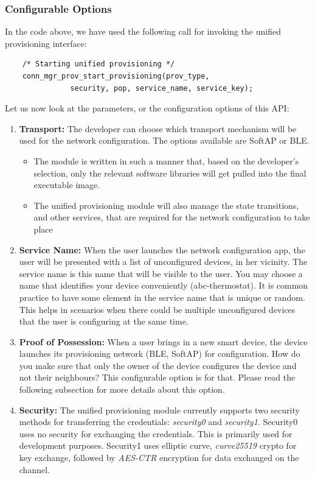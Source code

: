 \documentclass[main.tex]{subfiles}
\begin{document}
\subsubsection{Configurable Options}
In the code above, we have used the following call for invoking the unified provisioning interface:
\begin{verbatim}
    /* Starting unified provisioning */
    conn_mgr_prov_start_provisioning(prov_type,
               security, pop, service_name, service_key);
\end{verbatim}

Let us now look at the parameters, or the configuration options of this API:
\begin{enumerate}
    \item \textbf{Transport:} The developer can choose which transport mechanism will be used for the network configuration. The options available are SoftAP or BLE. 
    \begin{itemize}
        \item The module is written in such a manner that, based on the developer's selection, only the relevant software libraries will get pulled into the final executable image. 
        \item The unified provisioning module will also manage the state transitions, and other services, that are required for the network configuration to take place
    \end{itemize}
    \item \textbf{Service Name:} When the user launches the network configuration app, the user will be presented with a list of unconfigured devices, in her vicinity. The service name is this name that will be visible to the user. You may choose a name that identifies your device conveniently (abc-thermostat). It is common practice to have some element in the service name that is unique or random. This helps in scenarios when there could be multiple unconfigured devices that the user is configuring at the same time.
    \item \textbf{Proof of Possession:} When a user brings in a new smart device, the device launches its provisioning network (BLE, SoftAP) for configuration.  How do you make sure that only the owner of the device configures the device and not their neighbours? This configurable option is for that. Please read the following subsection for more details about this option.
    \item \textbf{Security:} The unified provisioning module currently supports two security methods for transferring the credentials: \textit{security0} and \textit{security1}. Security0 uses no security for exchanging the credentials. This is primarily used for development purposes. Security1 uses elliptic curve, \textit{curve25519} crypto for key exchange, followed by \textit{AES-CTR} encryption for data exchanged on the channel.
\end{enumerate}
\end{document}
